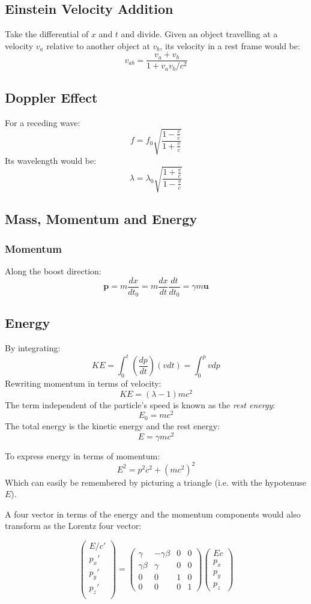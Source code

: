 \documentclass[12pt]{article}
\begin{document}
\subsection{Einstein Velocity Addition}
Take the differential of $x$ and $t$ and divide. Given an object travelling at a velocity $v_a$ relative to another object at $v_b$, its velocity in a rest frame would be:
\[v_{ab} = \frac{v_a+v_b}{1 + {v_av_b}/{c^2}}\]

\subsection{Doppler Effect}
For a receding wave:
\[ f = f_0 \sqrt{\frac{1-\frac{v}{c}}{1+\frac{v}{c}}}\]
Its wavelength would be:
\[ \lambda = \lambda_0 \sqrt{\frac{1+\frac{v}{c}}{1-\frac{v}{c}}}\]

\subsection{Mass, Momentum and Energy}
\subsubsection{Momentum}
Along the boost direction:
\[\mathbf{p} = m\frac{dx}{dt_0}=m\frac{dx}{dt}\frac{dt}{dt_0}=\gamma m\mathbf{u}\]

\subsection{Energy}
By integrating:
\[ KE = \int_0^t \left(\frac{dp}{dt}\right)(vdt) = \int^p_0 vdp\]
Rewriting momentum in terms of velocity:
\[ KE = (\lambda - 1) mc^2\]
The term independent of the particle's speed is known as the \textit{rest energy}:
\[E_0 = mc^2\]
The total energy is the kinetic energy and the rest energy:
\[E = \gamma mc^2\]

To express energy in terms of momentum:
\[ E^2 = p^2c^2 + (mc^2)^2\]
Which can easily be remembered by picturing a triangle (i.e. with the hypotenuse $E$).

A four vector in terms of the energy and the momentum components would also transform as the Lorentz four vector:


\[
\begin{pmatrix}
E/c'\\
p_x'\\
p_y'\\
p_z'\\
\end{pmatrix}
=
\begin{pmatrix}
\gamma &-\gamma\beta &0 &0\\
\gamma \beta &\gamma & 0 & 0\\
0 &0 & 1 & 0\\
0& 0&0&1
\end{pmatrix}
\begin{pmatrix}
Ec\\
p_x\\
p_y\\
p_z
\end{pmatrix}
\]
\end{document}
